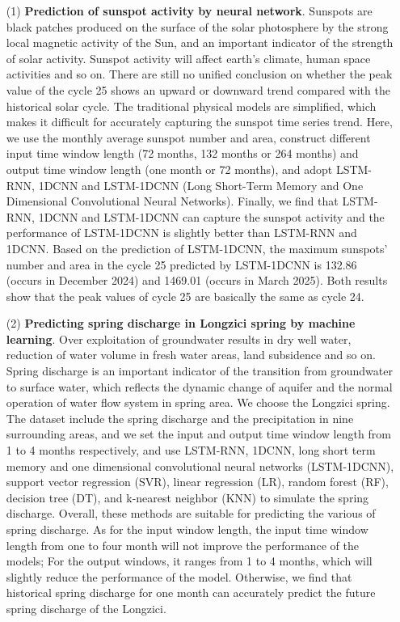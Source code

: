 \begin{enumerate}

  \item[(1)] \textbf{Prediction of sunspot activity by neural network}. Sunspots are black patches produced on the surface of the solar photosphere by the strong local magnetic activity of the Sun, and an important indicator of the strength of solar activity. Sunspot activity will affect earth's climate, human space activities and so on. There are still no unified conclusion on whether the peak value of the cycle 25 shows an upward or downward trend compared with the historical solar cycle. The traditional physical models are simplified, which makes it difficult for accurately capturing the sunspot time series trend. Here, we use the monthly average sunspot number and area, construct different input time window length (72 months, 132 months or 264 months) and output time window length (one month or 72 months), and adopt LSTM-RNN, 1DCNN and LSTM-1DCNN (Long Short-Term Memory and One Dimensional Convolutional Neural Networks). Finally, we find that LSTM-RNN, 1DCNN and LSTM-1DCNN can capture the sunspot activity and the performance of LSTM-1DCNN is slightly better than LSTM-RNN and 1DCNN. Based on the prediction of LSTM-1DCNN, the maximum sunspots' number and area in the cycle 25 predicted by LSTM-1DCNN is 132.86 (occurs in December 2024) and 1469.01 (occurs in March 2025). Both results show that the peak values of cycle 25 are basically the same as cycle 24. 

  \item[(2)] \textbf{Predicting spring discharge in Longzici spring by machine learning}. Over exploitation of groundwater results in dry well water, reduction of water volume in fresh water areas, land subsidence and so on. Spring discharge is an important indicator of the transition from groundwater to surface water, which reflects the dynamic change of aquifer and the normal operation of water flow system in spring area. We choose the Longzici spring. The dataset include the spring discharge and the precipitation in nine surrounding areas, and we set the input and output time window length from 1 to 4 months respectively, and use LSTM-RNN, 1DCNN, long short term memory and one dimensional convolutional neural networks (LSTM-1DCNN), support vector regression (SVR), linear regression (LR), random forest (RF), decision tree (DT), and k-nearest neighbor (KNN) to simulate the spring discharge.
  Overall, these methods are suitable for predicting the various of spring discharge. As for the input window length, the input time window length from one to four month will not improve the performance of the models; For the output windows, it ranges from 1 to 4 months, which will slightly reduce the performance of the model. Otherwise, we find that historical spring discharge for one month can accurately predict the future spring discharge of the Longzici.
  

\end{enumerate}
